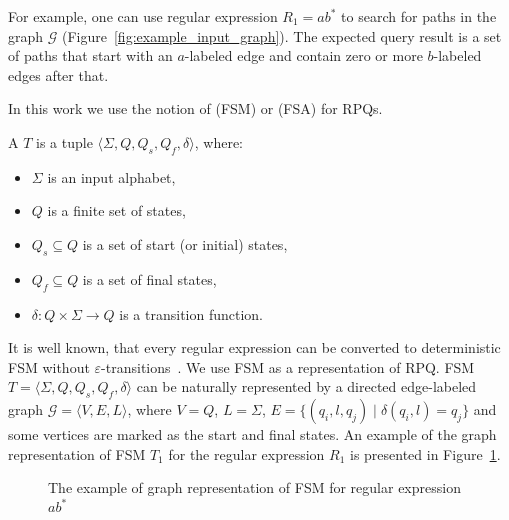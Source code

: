 For example, one can use regular expression $R_1 = ab^*$ to search for paths in the graph $\mathcal{G}$ (Figure~\ref{fig:example_input_graph}).
The expected query result is a set of paths that start with an $a$-labeled edge and contain zero or more $b$-labeled edges after that.

In this work we use the notion of  (FSM) or  (FSA) for RPQs.

\begin{definition}
A  $T$ is a tuple $\langle \Sigma, Q, Q_s, Q_f, \delta \rangle$, where:
\begin{itemize}
    \item $\Sigma$ is an input alphabet,
    \item $Q$ is a finite set of states,
    \item $Q_s \subseteq Q$ is a set of start (or initial) states,
    \item $Q_f \subseteq Q$ is a set of final states,
    \item $\delta: Q \times \Sigma \to Q$ is a transition function.
\end{itemize}
\end{definition}

It is well known, that every regular expression can be converted to deterministic FSM without $\varepsilon$-transitions~\citep{automata:theory:10.5555/1177300}.
We use FSM as a representation of RPQ.
FSM $T = \langle \Sigma, Q, Q_s, Q_f, \delta \rangle$ can be naturally represented by a directed edge-labeled graph $\mathcal{G} = \langle V,E,L \rangle$, where $V = Q$, $L = \Sigma$, $E = \{(q_i,l,q_j) \mid \delta(q_i,l) = q_j\}$ and some vertices are marked as the start and final states.
An example of the graph representation of FSM $T_1$ for the regular expression $R_1$ is presented in Figure~\ref{fig:example_fsm}.

\begin{figure}[h]
    \centering
    \caption{The example of graph representation of FSM for regular expression $ab^*$}
    \label{fig:example_fsm}
\end{figure}

